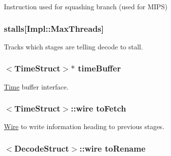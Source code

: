 \label{classDefaultDecode_ab16bbdee47d26fedf584262248b6b6e4}
Instruction used for squashing branch (used for MIPS) \hypertarget{classDefaultDecode_ade48cf321f5741ea8e54e071680cacdc}{
\subsubsection[{stalls}]{ {\bf stalls}\mbox{[}Impl::MaxThreads\mbox{]}}}
\label{classDefaultDecode_ade48cf321f5741ea8e54e071680cacdc}
Tracks which stages are telling decode to stall. \hypertarget{classDefaultDecode_a83f9ee976e732665aeb08dbc19acfd45}{
\subsubsection[{timeBuffer}]{$<${\bf TimeStruct}$>$$\ast$ {\bf timeBuffer}}}
\label{classDefaultDecode_a83f9ee976e732665aeb08dbc19acfd45}
\hyperlink{classTime}{Time} buffer interface. \hypertarget{classDefaultDecode_acc94cfae2a67b5dbb0e74e81c24a3b6e}{
\subsubsection[{toFetch}]{$<${\bf TimeStruct}$>$::wire {\bf toFetch}}}
\label{classDefaultDecode_acc94cfae2a67b5dbb0e74e81c24a3b6e}
\hyperlink{classWire}{Wire} to write information heading to previous stages. \hypertarget{classDefaultDecode_ac096c67e7877c089a5417aa83a721edc}{
\subsubsection[{toRename}]{$<${\bf DecodeStruct}$>$::wire {\bf toRename}}}

